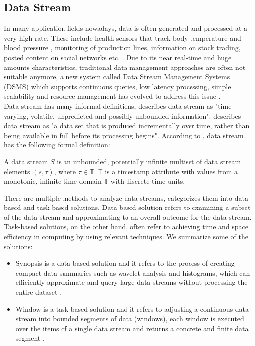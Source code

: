 \documentclass[runningheads]{llncs}
\begin{document}
\subsection{Data Stream}
In many application fields nowadays, data is often generated and processed at a very high rate. These include health sensors that track body temperature and blood pressure \cite{Geisler13},
monitoring of production lines, information on stock trading, posted content on social networks etc. \cite{Geisler16}. Due to its near real-time and huge amounts characteristics, traditional data management
approaches are often not suitable anymore, a new system called Data Stream Management Systems (DSMS) which supports continuous queries, low latency processing, simple scalability and resource management
 has evolved to address this issue \cite{Geisler16}. \\
\noindent \newline
Data stream has many informal definitions, \cite{Patro06} describes data stream as "time-varying, volatile, unpredicted and possibly unbounded information". \cite{Golab03} describes data stream as
"a data set that is produced incrementally over time, rather than being available in full before its processing begins". According to \cite{Geisler13}, data stream has the following formal definition:
\begin{definition}
  A data stream $S$ is an unbounded, potentially infinite multiset of data stream elements $(s,\tau)$, where $\tau \in \mathbb{T}$. $\mathbb{T}$ is a timestamp attribute with values from a monotonic, infinite time domain $\mathbb{T}$ with discrete time units.
\end{definition} 
\noindent
There are multiple methods to analyze data streams, \cite{Gaber05} categorizes them into data-based and task-based solutions. Data-based solution refers to examining a subset of the data stream and approximating to an
overall outcome for the data stream. Task-based solutions, on the other hand, often refer to achieving time and space efficiency in computing by using relevant techniques. We summarize some of the solutions:
\begin{itemize}
  \item Synopsis is a data-based solution and it refers to the process of creating compact data summaries such as wavelet analysis and histograms, which can efficiently approximate and query large data streams without processing the entire dataset \cite{Gaber05}.
  \item Window is a task-based solution and it refers to adjusting a continuous data stream into bounded segments of data (windows), each window is executed over the items of a single data stream and returns a concrete and finite data segment \cite{Patro06}.
\end{itemize}
\end{document}
